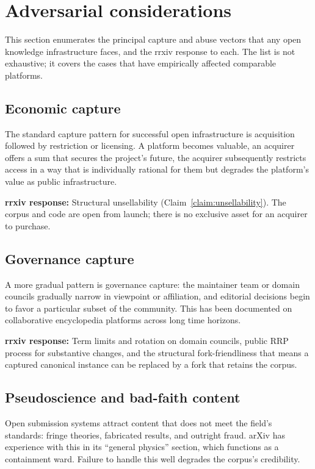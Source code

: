 \documentclass[11pt]{rrxiv}
\begin{document}
\section{Adversarial considerations}
\label{sec:adversarial}

This section enumerates the principal capture and abuse vectors that any open knowledge infrastructure faces, and the rrxiv response to each. The list is not exhaustive; it covers the cases that have empirically affected comparable platforms.

\subsection{Economic capture}

The standard capture pattern for successful open infrastructure is acquisition followed by restriction or licensing. A platform becomes valuable, an acquirer offers a sum that secures the project's future, the acquirer subsequently restricts access in a way that is individually rational for them but degrades the platform's value as public infrastructure.

\textbf{rrxiv response:} Structural unsellability (Claim~\ref{claim:unsellability}). The corpus and code are open from launch; there is no exclusive asset for an acquirer to purchase.

\subsection{Governance capture}

A more gradual pattern is governance capture: the maintainer team or domain councils gradually narrow in viewpoint or affiliation, and editorial decisions begin to favor a particular subset of the community. This has been documented on collaborative encyclopedia platforms across long time horizons.

\textbf{rrxiv response:} Term limits and rotation on domain councils, public RRP process for substantive changes, and the structural fork-friendliness that means a captured canonical instance can be replaced by a fork that retains the corpus.

\subsection{Pseudoscience and bad-faith content}

Open submission systems attract content that does not meet the field's standards: fringe theories, fabricated results, and outright fraud. arXiv has experience with this in its ``general physics'' section, which functions as a containment ward. Failure to handle this well degrades the corpus's credibility.
\end{document}
